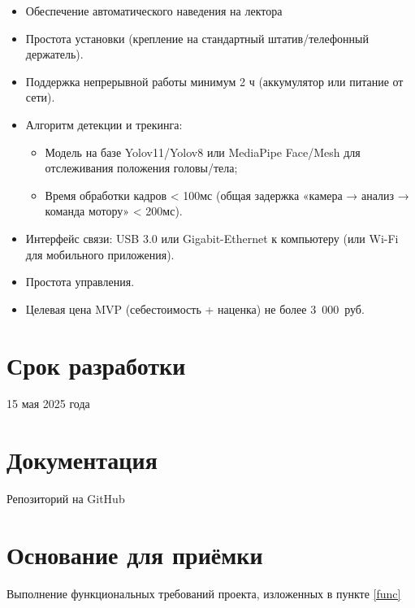 \begin{itemize}
    \item Обеспечение автоматического наведения на лектора
    \item Простота установки (крепление на стандартный штатив/телефонный держатель). 
    \item Поддержка непрерывной работы минимум 2 ч (аккумулятор или питание от сети). 
    \item Алгоритм детекции и трекинга:
\begin{itemize}
    \item Модель на базе Yolov11/Yolov8 или MediaPipe Face/Mesh для отслеживания положения головы/тела;
    \item Время обработки кадров < 100мс (общая задержка «камера → анализ → команда мотору» < 200мс).
\end{itemize}
\item Интерфейс связи: USB 3.0 или Gigabit-Ethernet к компьютеру (или Wi-Fi для мобильного приложения).
\item Простота управления.
\item Целевая цена MVP (себестоимость + наценка) не более 3 000 руб.

 
\end{itemize}

\section{Срок разработки}

15 мая 2025 года

\section{Документация}

Репозиторий на GitHub

\section{Основание для приёмки}

Выполнение функциональных требований проекта, изложенных в пункте \ref{func}

